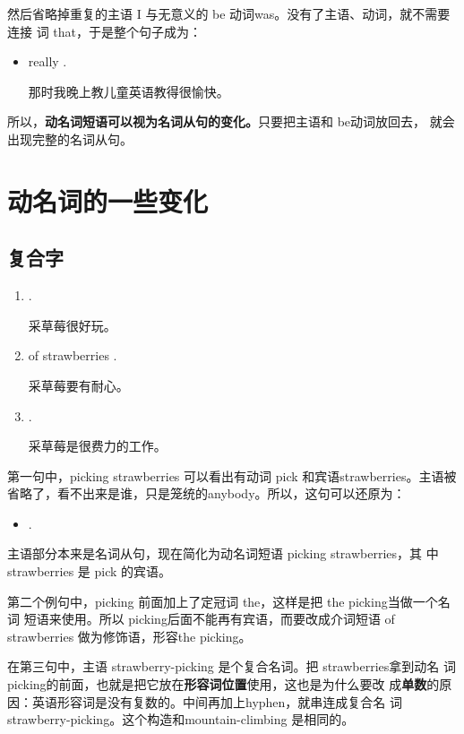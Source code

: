 然后省略掉重复的主语 I 与无意义的 be 动词was。没有了主语、动词，就不需要连接
词 that，于是整个句子成为：
\begin{itemize}
\item {} really  .

那时我晚上教儿童英语教得很愉快。
\end{itemize}

所以，\textbf{动名词短语可以视为名词从句的变化。}只要把主语和 be动词放回去，
就会出现完整的名词从句。

\section{动名词的一些变化}

\subsection{复合字}

\begin{enumerate}
\item  {}  .

采草莓很好玩。
\item  {} of strawberries  .

采草莓要有耐心。
\item  {}  .

采草莓是很费力的工作。
\end{enumerate}

第一句中，picking strawberries 可以看出有动词 pick 和宾语strawberries。主语被
省略了，看不出来是谁，只是笼统的anybody。所以，这句可以还原为：

\begin{itemize}
\item {} 
  .
\end{itemize}

主语部分本来是名词从句，现在简化为动名词短语 picking strawberries，其
中strawberries 是 pick 的宾语。

第二个例句中，picking 前面加上了定冠词 the，这样是把 the picking当做一个名词
短语来使用。所以 picking后面不能再有宾语，而要改成介词短语 of strawberries
做为修饰语，形容the picking。

在第三句中，主语 strawberry-picking 是个复合名词。把 strawberries拿到动名
词 picking的前面，也就是把它放在\textbf{形容词位置}使用，这也是为什么要改
成\textbf{单数}的原因：英语形容词是没有复数的。中间再加上hyphen，就串连成复合名
词 strawberry-picking。这个构造和mountain-climbing 是相同的。

